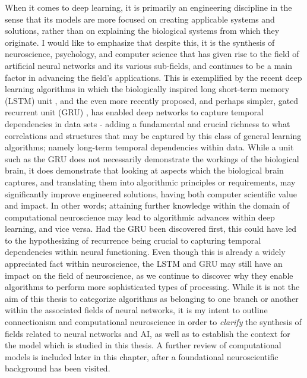 When it comes to deep learning, it is primarily an engineering discipline in the sense that its models are more focused on creating applicable systems and solutions, rather than on explaining the biological systems from which they originate. I would like to emphasize that despite this, it is the synthesis of neuroscience, psychology, and computer science that has given rise to the field of artificial neural networks \citep{McCulloch1943} and its various sub-fields, and continues to be a main factor in advancing the field's applications. This is exemplified by the recent deep learning algorithms in which the biologically inspired long short-term memory (LSTM) unit \citep{Hochreiter1997}, and the even more recently proposed, and perhaps simpler, gated recurrent unit (GRU) \citep{Mnih2015}, has enabled deep networks to capture temporal dependencies in data sets - adding a fundamental and crucial richness to what correlations and structures that may be captured by this class of general learning algorithms; namely long-term temporal dependencies within data. 
While a unit such as the GRU does not necessarily demonstrate the workings of the biological brain, it does demonstrate that looking at aspects which the biological brain captures, and translating them into algorithmic principles or requirements, may significantly improve engineered solutions, having both computer scientific value and impact. In other words; attaining further knowledge within the domain of computational neuroscience may lead to algorithmic advances within deep learning, and vice versa. Had the GRU been discovered first, this could have led to the hypothesizing of recurrence being crucial to capturing temporal dependencies within neural functioning. Even though this is already a widely appreciated fact within neuroscience, the LSTM and GRU may still have an impact on the field of neuroscience, as we continue to discover why they enable algorithms to perform more sophisticated types of processing. While it is not the aim of this thesis to categorize algorithms as belonging to one branch or another within the associated fields of neural networks, it is my intent to outline connectionism and computational neuroscience in order to \textit{clarify} the synthesis of fields related to neural networks and AI, as well as to establish the context for the model which is studied in this thesis. A further review of computational models is included later in this chapter, after a foundational neuroscientific background has been visited.

